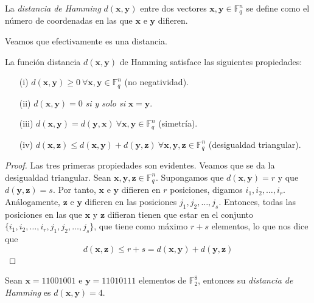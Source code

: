 \begin{definicion}
  La \emph{distancia de Hamming} $d(\mathbf{x,y})$ entre dos vectores $\mathbf{x,y} \in \mathds{F}_{q}^n$ se define como el número de coordenadas en las que $\mathbf{x}$ e $\mathbf{y}$ difieren.
\end{definicion}
Veamos que efectivamente es una distancia.

\begin{teorema}
  La función distancia $d(\mathbf{x,y})$ de Hamming satisface las siguientes propiedades:
  \begin{enumerate}
    \item[(i)] $d(\mathbf{x,y}) \geq 0 \ \forall \mathbf{x,y} \in \mathds{F}_{q}^n$ (no negatividad).
    \item[(ii)] $d(\mathbf{x,y}) = 0$ \emph{si y solo si} $\mathbf{x} = \mathbf{y}$.
    \item[(iii)] $d(\mathbf{x,y}) = d(\mathbf{y,x}) \ \forall \mathbf{x,y} \in \mathds{F}_{q}^n$ (simetría).
    \item[(iv)] $d(\mathbf{x,z}) \leq d(\mathbf{x,y}) + d(\mathbf{y,z}) \ \forall \mathbf{x,y,z} \in \mathds{F}_{q}^n$ (desigualdad triangular).
  \end{enumerate}
\end{teorema}

\begin{proof}

  Las tres primeras propiedades son evidentes. Veamos que se da la desigualdad triangular. Sean $\mathbf{x,y,z} \in \mathbb{F}_q^n$. Supongamos que $d(\mathbf{x},\mathbf{y}) = r$ y que $d(\mathbf{y},\mathbf{z}) = s$. Por tanto, $\mathbf{x}$ e $\mathbf y$ difieren en $r$ posiciones, digamos $i_1,i_2,\dots,i_r$. Análogamente, $\mathbf{z}$ e $\mathbf{y}$ difieren en las posiciones $j_1,j_2,\dots,j_s$. Entonces, todas las posiciones en las que $\mathbf{x}$ y $\mathbf{z}$ difieran tienen que estar en el conjunto $\{i_1,i_2,\dots,i_r,j_1,j_2,\dots,j_s\}$, que tiene como máximo $r+s$ elementos, lo que nos dice que 
  $$d(\mathbf{x},\mathbf{z}) \leq r + s = d(\mathbf{x},\mathbf{y}) + d(\mathbf{y},\mathbf{z})$$
  
\end{proof}

\begin{ejemplo}
  Sean $\mathbf{x} = 11001001$ e $\mathbf{y} = 11010111$ elementos de $\mathds{F}_{2}^8$, entonces su \emph{distancia de Hamming} es $d(\mathbf{x,y}) = 4$.
\end{ejemplo}

